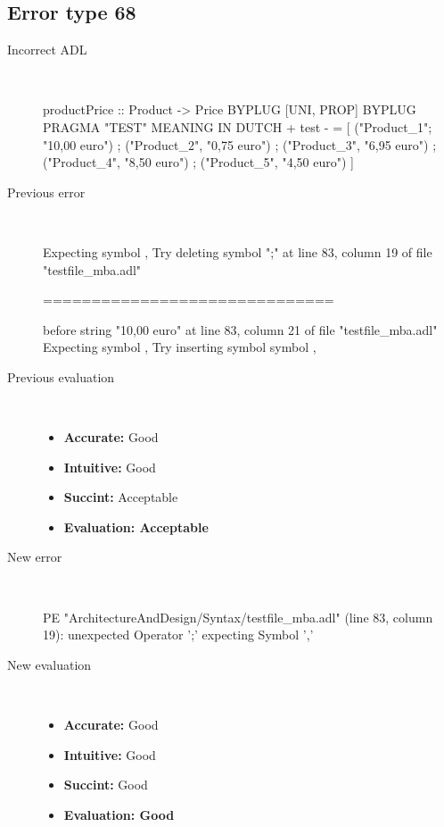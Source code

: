 \subsection{Error type 68}
  \begin{description}
  \item[Incorrect ADL]~\\
\begin{adl}
productPrice :: Product -> Price BYPLUG [UNI, PROP] BYPLUG PRAGMA "TEST"
MEANING IN DUTCH  {+ test -}
  = [ ("Product_1"; "10,00 euro")
    ; ("Product_2", "0,75 euro")
    ; ("Product_3", "6,95 euro")
    ; ("Product_4", "8,50 euro")
    ; ("Product_5", "4,50 euro")
    ]\end{adl}
  \item[Previous error]~\\
\begin{haskell}
Expecting symbol ,
Try deleting symbol ";" at line 83, column 19 of file "testfile_mba.adl"

==============================

before string "10,00 euro" at line 83, column 21 of file "testfile_mba.adl"
Expecting symbol ,
Try inserting symbol symbol ,
\end{haskell}
  \item[Previous evaluation]~\\
    \begin{itemize}
    \item \textbf{Accurate:} Good
    \item \textbf{Intuitive:} Good
    \item \textbf{Succint:} Acceptable
    \item \textbf{Evaluation: Acceptable}
    \end{itemize}
  \item[New error]~\\
\begin{haskell}
PE "ArchitectureAndDesign/Syntax/testfile_mba.adl" (line 83, column 19):
unexpected Operator ';'
expecting Symbol ','\end{haskell}
  \item[New evaluation]~\\
    \begin{itemize}
    \item \textbf{Accurate:} Good
    \item \textbf{Intuitive:} Good
    \item \textbf{Succint:} Good
    \item \textbf{Evaluation: Good
}
    \end{itemize}
  \end{description}

